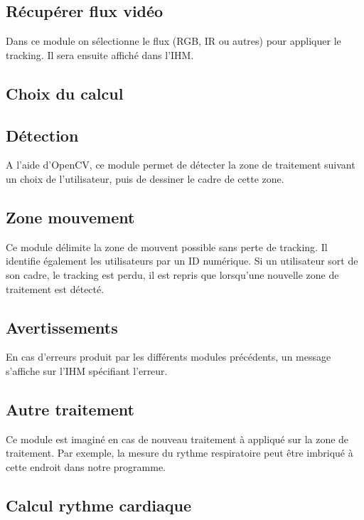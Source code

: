 \documentclass[12pt,a4paper]{article}
\begin{document}
\subsection*{Récupérer flux vidéo}

Dans ce module on sélectionne le flux (RGB, IR ou autres) pour appliquer le tracking. Il sera ensuite affiché dans l'IHM.


\subsection*{Choix du calcul}



\subsection*{Détection}
A l'aide d'OpenCV, ce module permet de détecter la zone de traitement suivant un choix de l'utilisateur, puis de dessiner le cadre de cette zone.

\subsection*{Zone mouvement}

Ce module délimite la zone de mouvent possible sans perte de tracking. Il identifie également les utilisateurs par un ID numérique. Si un utilisateur sort de son cadre, le tracking est perdu, il est repris que lorsqu'une nouvelle zone de traitement est détecté.

\subsection*{Avertissements}
En cas d'erreurs produit par les différents modules précédents, un message s'affiche sur l'IHM spécifiant l'erreur.

\subsection*{Autre traitement}

Ce module est imaginé en cas de nouveau traitement à appliqué sur la zone de traitement. Par exemple, la mesure du rythme respiratoire peut être imbriqué à cette endroit dans notre programme.

\subsection*{Calcul rythme cardiaque}
\end{document}
